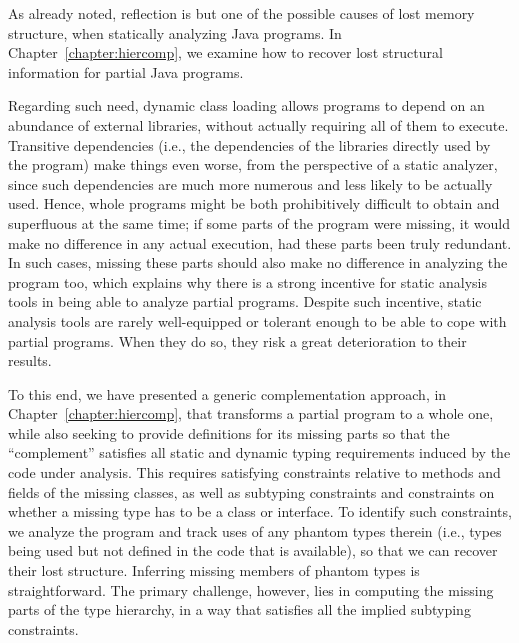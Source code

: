As already noted, reflection is but one of the possible causes of lost
memory structure, when statically analyzing Java programs. In
Chapter~\ref{chapter:hiercomp}, we examine how to recover lost
structural information for partial Java programs.


Regarding such need, dynamic class loading allows programs to depend
on an abundance of external libraries, without actually requiring all
of them to execute. Transitive dependencies (i.e., the dependencies of
the libraries directly used by the program) make things even worse,
from the perspective of a static analyzer, since such dependencies are
much more numerous and less likely to be actually used. Hence, whole
programs might be both prohibitively difficult to obtain and
superfluous at the same time; if some parts of the program were
missing, it would make no difference in any actual execution, had
these parts been truly redundant. In such cases, missing these parts
should also make no difference in analyzing the program too, which
explains why there is a strong incentive for static analysis tools in
being able to analyze partial programs. Despite such incentive, static
analysis tools are rarely well-equipped or tolerant enough to be able
to cope with partial programs. When they do so, they risk a great
deterioration to their results.

To this end, we have presented a generic complementation approach, in
Chapter~\ref{chapter:hiercomp}, that transforms a partial program to a
whole one, while also seeking to provide definitions for its missing
parts so that the ``complement'' satisfies all static and dynamic
typing requirements induced by the code under analysis. This requires
satisfying constraints relative to methods and fields of the missing
classes, as well as subtyping constraints and constraints on whether a
missing type has to be a class or interface.
%
To identify such constraints, we analyze the program and track uses
of any phantom types therein (i.e., types being used but not defined
in the code that is available), so that we can recover their
lost structure. Inferring missing members of phantom types is
straightforward. The primary challenge, however, lies in computing the
missing parts of the type hierarchy, in a way that satisfies all the
implied subtyping constraints.

